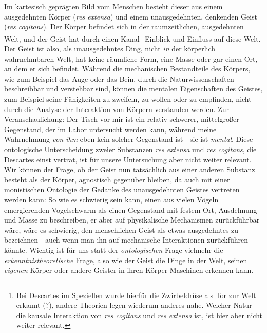 \documentclass[a4paper, 12pt]{article}
\begin{document}
\begin{onehalfspace}
\noindent Im kartesisch geprägten Bild vom Menschen besteht dieser aus einem ausgedehnten Körper (\emph{res extensa}) und einem unausgedehnten, denkenden Geist (\emph{res cogitans}). Der Körper befindet sich in der raumzeitlichen, ausgedehnten Welt, und der Geist hat durch einen Kanal\footnote{Bei Descartes im Speziellen wurde hierfür die Zwirbeldrüse als Tor zur Welt erkannt (?), andere Theorien legen wiederum anderes nahe. Welcher Natur die kausale Interaktion von \emph{res cogitans} und \emph{res extensa} ist, ist hier aber nicht weiter relevant.} Einblick und Einfluss auf diese Welt. Der Geist ist also, als unausgedehntes Ding, nicht \emph{in} der körperlich wahrnehmbaren Welt, hat keine räumliche Form, eine Masse oder gar einen Ort, an dem er sich befindet. Während die mechanischen Bestandteile des Körpers, wie zum Beispiel das Auge oder das Bein, durch die Naturwissenschaften beschreibbar und verstehbar sind, können die mentalen Eigenschaften des Geistes, zum Beispiel seine Fähigkeiten zu zweifeln, zu wollen oder zu empfinden, nicht durch die Analyse der Interaktion von Körpern verstanden werden. Zur Veranschaulichung:  Der Tisch vor mir ist ein relativ schwerer, mittelgroßer Gegenstand, der im Labor untersucht werden kann, während meine Wahrnehmung \emph{von ihm} eben kein solcher Gegenstand ist - sie ist \emph{mental}. Diese ontologische Unterscheidung zweier Substanzen \emph{res extensa} und \emph{res cogitans}, die Descartes einst vertrat, ist für unsere Untersuchung aber nicht weiter relevant. Wir können der Frage, ob der Geist nun tatsächlich aus einer anderen Substanz besteht als der Körper, agnostisch gegenüber bleiben, da auch mit einer monistischen Ontologie der Gedanke des unausgedehnten Geistes vertreten werden kann: So wie es schwierig sein kann, einen aus vielen Vögeln emergierenden Vogelschwarm als einen Gegenstand mit festem Ort, Ausdehnung und Masse zu beschreiben, er aber auf physikalische Mechanismen zurückführbar wäre, wäre es schwierig, den menschlichen Geist als etwas ausgedehntes zu bezeichnen - auch wenn man ihn auf mechanische Interaktionen zurückführen könnte. Wichtig ist für uns statt der \emph{ontologischen} Frage vielmehr die \emph{erkenntnistheoretische} Frage, also wie der Geist die Dinge in der Welt, seinen \emph{eigenen} Körper oder andere Geister in ihren Körper-Maschinen erkennen kann.


\end{onehalfspace}
\end{document}
